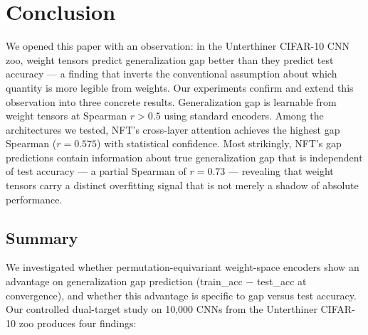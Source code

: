 \section{Conclusion}
\label{sec:conclusion}

We opened this paper with an observation: in the Unterthiner CIFAR-10 CNN zoo, weight tensors predict
generalization gap better than they predict test accuracy --- a finding that inverts the conventional
assumption about which quantity is more legible from weights. Our experiments confirm and extend this
observation into three concrete results. Generalization gap is learnable from weight tensors at Spearman
$r > 0.5$ using standard encoders. Among the architectures we tested, NFT's cross-layer attention achieves
the highest gap Spearman ($r = 0.575$) with statistical confidence. Most strikingly, NFT's gap predictions
contain information about true generalization gap that is independent of test accuracy --- a partial
Spearman of $r = 0.73$ --- revealing that weight tensors carry a distinct overfitting signal that is not
merely a shadow of absolute performance.

\subsection*{Summary}

We investigated whether permutation-equivariant weight-space encoders show an advantage on generalization
gap prediction (train\_acc $-$ test\_acc at convergence), and whether this advantage is specific to gap
versus test accuracy. Our controlled dual-target study on 10,000 CNNs from the Unterthiner CIFAR-10 zoo
produces four findings:

